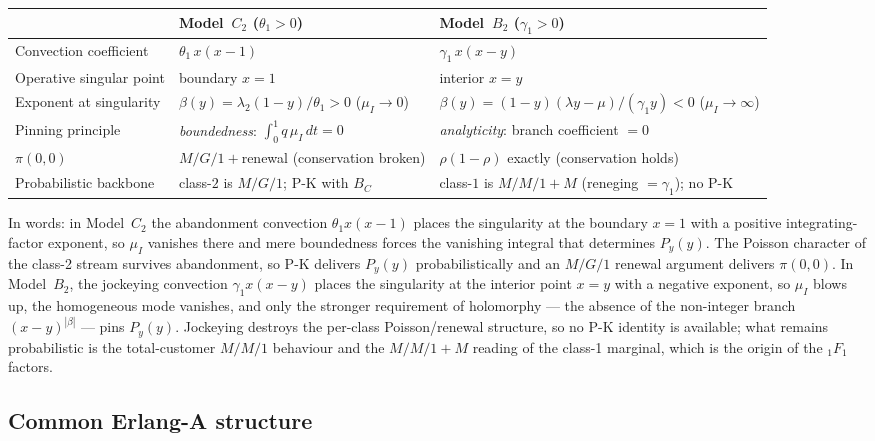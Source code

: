 \begin{center}
\renewcommand{\arraystretch}{1.45}
\begin{tabular}{p{} p{} p{}}
\hline
 & \textbf{Model~$C_2$ ($\theta_1>0$)} & \textbf{Model~$B_2$ ($\gamma_1>0$)} \\
\hline
Convection coefficient
 & $\theta_1\,x(x-1)$
 & $\gamma_1\,x(x-y)$ \\
Operative singular point
 & boundary $x=1$
 & interior $x=y$ \\
Exponent at singularity
 & $\beta(y)=\lambda_2(1-y)/\theta_1>0$ \;($\mu_I\to0$)
 & $\beta(y)=(1-y)(\lambda y-\mu)/(\gamma_1 y)<0$ \;($\mu_I\to\infty$) \\
Pinning principle
 & \emph{boundedness}: $\int_0^1 q\,\mu_I\,dt=0$
 & \emph{analyticity}: branch coefficient $=0$ \\
$\pi(0,0)$
 & $M/G/1{+}$renewal (conservation broken)
 & $\rho(1-\rho)$ exactly (conservation holds) \\
Probabilistic backbone
 & class-$2$ is $M/G/1$; P-K with $B_C$
 & class-$1$ is $M/M/1{+}M$ (reneging $=\gamma_1$); no P-K \\
\hline
\end{tabular}
\end{center}

In words: in Model~$C_2$ the abandonment convection $\theta_1 x(x-1)$ places
the singularity at the boundary $x=1$ with a positive integrating-factor
exponent, so $\mu_I$ vanishes there and mere boundedness forces the vanishing
integral that determines $P_y(y)$.  The Poisson character of the class-2
stream survives abandonment, so P-K delivers $P_y(y)$ probabilistically and
an $M/G/1$ renewal argument delivers $\pi(0,0)$.  In Model~$B_2$, the
jockeying convection $\gamma_1 x(x-y)$ places the singularity at the interior
point $x=y$ with a negative exponent, so $\mu_I$ blows up, the homogeneous
mode vanishes, and only the stronger requirement of holomorphy --- the absence
of the non-integer branch $(x-y)^{|\beta|}$ --- pins $P_y(y)$.  Jockeying
destroys the per-class Poisson/renewal structure, so no P-K identity is
available; what remains probabilistic is the total-customer $M/M/1$ behaviour
and the $M/M/1{+}M$ reading of the class-1 marginal, which is the origin of
the ${}_1F_1$ factors.

\subsection*{Common Erlang-A structure}

